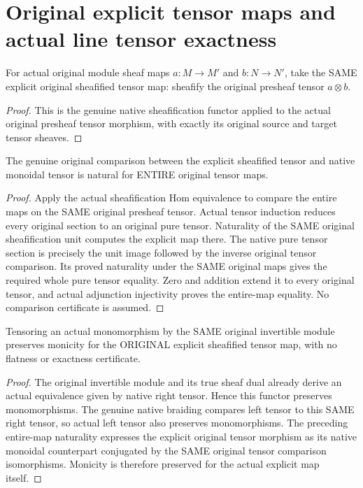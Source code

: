 \section{Original explicit tensor maps and actual line tensor exactness}

\begin{definition}\label{sc0-tensor-obj-morphisms:map}
\leanok
For actual original module sheaf maps $a:M\to M'$ and $b:N\to N'$, take the SAME explicit original sheafified tensor map: sheafify the original presheaf tensor $a\otimes b$.
\end{definition}
\begin{proof}
This is the genuine native sheafification functor applied to the actual original presheaf tensor morphism, with exactly its original source and target tensor sheaves.
\end{proof}

\begin{lemma}\label{sc0-tensor-obj-morphisms:natural}
\leanok
{}
The genuine original comparison between the explicit sheafified tensor and native monoidal tensor is natural for ENTIRE original tensor maps.
\end{lemma}
\begin{proof}
Apply the actual sheafification Hom equivalence to compare the entire maps on the SAME original presheaf tensor. Actual tensor induction reduces every original section to an original pure tensor. Naturality of the SAME original sheafification unit computes the explicit map there. The native pure tensor section is precisely the unit image followed by the inverse original tensor comparison. Its proved naturality under the SAME original maps gives the required whole pure tensor equality. Zero and addition extend it to every original tensor, and actual adjunction injectivity proves the entire-map equality. No comparison certificate is assumed.
\end{proof}

\begin{theorem}\label{sc0-tensor-obj-morphisms:mono}
\leanok
{}
Tensoring an actual monomorphism by the SAME original invertible module preserves monicity for the ORIGINAL explicit sheafified tensor map, with no flatness or exactness certificate.
\end{theorem}
\begin{proof}
The original invertible module and its true sheaf dual already derive an actual equivalence given by native right tensor. Hence this functor preserves monomorphisms. The genuine native braiding compares left tensor to this SAME right tensor, so actual left tensor also preserves monomorphisms. The preceding entire-map naturality expresses the explicit original tensor morphism as its native monoidal counterpart conjugated by the SAME original tensor comparison isomorphisms. Monicity is therefore preserved for the actual explicit map itself.
\end{proof}
